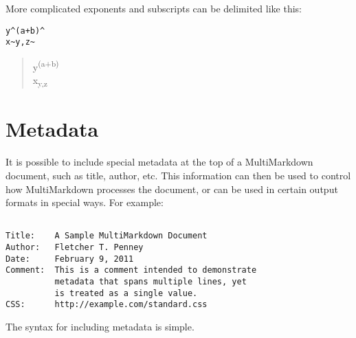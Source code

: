 More complicated exponents and subscripts can be delimited like this:

\begin{verbatim}
y^(a+b)^
x~y,z~
\end{verbatim}

\begin{quote}
y\textsuperscript{(a+b)}\\
x\textsubscript{y,z}
\end{quote}

\section{Metadata}
\label{metadata}

It is possible to include special metadata at the top of a MultiMarkdown
document, such as title, author, etc. This information can then be used to
control how MultiMarkdown processes the document, or can be used in certain
output formats in special ways. For example:

\begin{verbatim}

Title:    A Sample MultiMarkdown Document  
Author:   Fletcher T. Penney  
Date:     February 9, 2011  
Comment:  This is a comment intended to demonstrate  
          metadata that spans multiple lines, yet  
          is treated as a single value.  
CSS:      http://example.com/standard.css
\end{verbatim}

The syntax for including metadata is simple.

